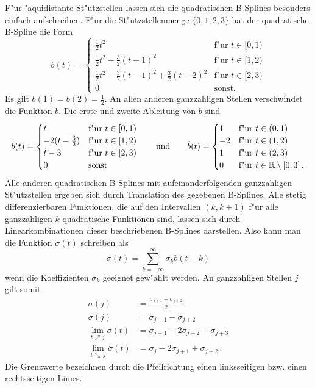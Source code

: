 \documentclass[a4paper]{scrartcl}
\newcommand{\R}{{\mathbb{R}}}
\begin{document}
F"ur "aquidistante St"utzstellen lassen sich die quadratischen B-Splines besonders einfach aufschreiben. 
F"ur die St"utzstellenmenge $\{0,1,2,3\}$ hat der quadratische B-Spline die Form
$$ b(t)=\begin{cases}
\frac12t^2 & \text{f"ur $t\in[0,1)$} \\
\frac12t^2-\frac32(t-1)^2 & \text{f"ur $t\in[1,2)$} \\
\frac12t^2-\frac32(t-1)^2+\frac32(t-2)^2 & \text{f"ur $t\in[2,3)$} \\
0 & \text{sonst.}
\end{cases} $$
Es gilt $b(1)=b(2)=\frac12$. 
An allen anderen ganzzahligen Stellen verschwindet die Funktion $b$. 
Die erste und zweite Ableitung von $b$ sind
$$ \dot b(t)=\begin{cases}
t & \text{f"ur $t\in[0,1)$} \\
-2(t-\frac32) & \text{f"ur $t\in[1,2)$} \\
t-3 & \text{f"ur $t\in[2,3)$} \\
0 & \text{sonst}
\end{cases} 
\qquad \text{und} \qquad
\ddot b(t)=\begin{cases}
1 & \text{f"ur $t\in(0,1)$} \\
-2 & \text{f"ur $t\in(1,2)$} \\
1 & \text{f"ur $t\in(2,3)$} \\
0 & \text{f"ur $t\in\R\setminus[0,3]$\,.}
\end{cases} $$
Alle anderen quadratischen B-Splines mit aufeinanderfolgenden ganzzahligen St"utzstellen ergeben sich durch Translation des gegebenen B-Splines. 
Alle stetig differenzierbaren Funktionen, die auf den Intervallen $(k,k+1)$ f"ur alle ganzzahligen $k$ quadratische Funktionen sind, lassen sich durch Linearkombinationen dieser beschriebenen B-Splines darstellen. 
Also kann man die Funktion $\sigma(t)$ schreiben als
$$ \sigma(t) = \sum_{k=-\infty}^{\infty}\sigma_kb(t-k) $$
wenn die Koeffizienten $\sigma_k$ geeignet gew"ahlt werden. 
An ganzzahligen Stellen $j$ gilt somit
\begin{align*}
\sigma(j) &= \frac{\sigma_{j+1}+\sigma_{j+2}}{2} \\
\dot\sigma(j) &= \sigma_{j+1}-\sigma_{j+2} \\
\lim_{t\nearrow j}\ddot\sigma(t) &= \sigma_{j+1}-2\sigma_{j+2}+\sigma_{j+3} \\
\lim_{t\searrow\,j}\ddot\sigma(t) &= \sigma_{j}-2\sigma_{j+1}+\sigma_{j+2}\,.
\end{align*}
Die Grenzwerte bezeichnen durch die Pfeilrichtung einen linksseitigen bzw. einen rechtsseitigen Limes. 
\end{document}
